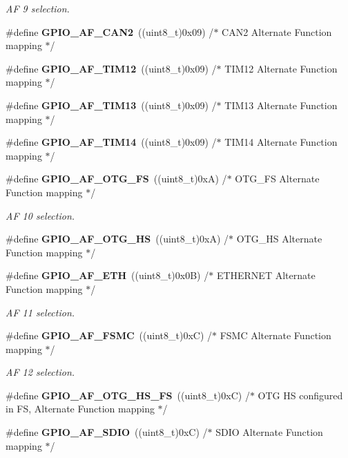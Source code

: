 \begin{DoxyCompactItemize}
\begin{DoxyCompactList}\small\item\em AF 9 selection. \end{DoxyCompactList}\item 
\#define \textbf{ G\+P\+I\+O\+\_\+\+A\+F\+\_\+\+C\+A\+N2}~((uint8\+\_\+t)0x09)  /$\ast$ C\+A\+N2 Alternate Function mapping $\ast$/
\item 
\#define \textbf{ G\+P\+I\+O\+\_\+\+A\+F\+\_\+\+T\+I\+M12}~((uint8\+\_\+t)0x09)  /$\ast$ T\+I\+M12 Alternate Function mapping $\ast$/
\item 
\#define \textbf{ G\+P\+I\+O\+\_\+\+A\+F\+\_\+\+T\+I\+M13}~((uint8\+\_\+t)0x09)  /$\ast$ T\+I\+M13 Alternate Function mapping $\ast$/
\item 
\#define \textbf{ G\+P\+I\+O\+\_\+\+A\+F\+\_\+\+T\+I\+M14}~((uint8\+\_\+t)0x09)  /$\ast$ T\+I\+M14 Alternate Function mapping $\ast$/
\item 
\#define \textbf{ G\+P\+I\+O\+\_\+\+A\+F\+\_\+\+O\+T\+G\+\_\+\+FS}~((uint8\+\_\+t)0x\+A)  /$\ast$ O\+T\+G\+\_\+\+F\+S Alternate Function mapping $\ast$/
\begin{DoxyCompactList}\small\item\em AF 10 selection. \end{DoxyCompactList}\item 
\#define \textbf{ G\+P\+I\+O\+\_\+\+A\+F\+\_\+\+O\+T\+G\+\_\+\+HS}~((uint8\+\_\+t)0x\+A)  /$\ast$ O\+T\+G\+\_\+\+H\+S Alternate Function mapping $\ast$/
\item 
\#define \textbf{ G\+P\+I\+O\+\_\+\+A\+F\+\_\+\+E\+TH}~((uint8\+\_\+t)0x0\+B)  /$\ast$ E\+T\+H\+E\+R\+N\+E\+T Alternate Function mapping $\ast$/
\begin{DoxyCompactList}\small\item\em AF 11 selection. \end{DoxyCompactList}\item 
\#define \textbf{ G\+P\+I\+O\+\_\+\+A\+F\+\_\+\+F\+S\+MC}~((uint8\+\_\+t)0x\+C)  /$\ast$ F\+S\+M\+C Alternate Function mapping $\ast$/
\begin{DoxyCompactList}\small\item\em AF 12 selection. \end{DoxyCompactList}\item 
\#define \textbf{ G\+P\+I\+O\+\_\+\+A\+F\+\_\+\+O\+T\+G\+\_\+\+H\+S\+\_\+\+FS}~((uint8\+\_\+t)0x\+C)  /$\ast$ O\+T\+G H\+S configured in F\+S, Alternate Function mapping $\ast$/
\item 
\#define \textbf{ G\+P\+I\+O\+\_\+\+A\+F\+\_\+\+S\+D\+IO}~((uint8\+\_\+t)0x\+C)  /$\ast$ S\+D\+I\+O Alternate Function mapping $\ast$/

\end{DoxyCompactItemize}
